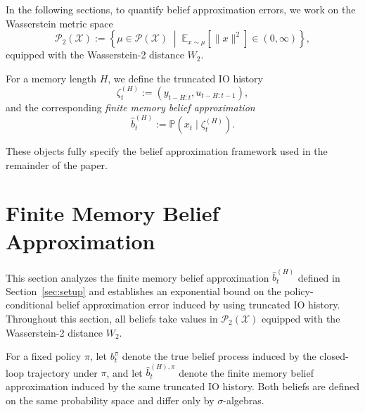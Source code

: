 \documentclass[letterpaper, 10 pt, conference]{ieeeconf}
\begin{document}
In the following sections, to quantify belief approximation errors, we work on the Wasserstein metric space
\begin{equation}
\label{eq:Wasserstein-metric-space}
\mathcal{P}_2(\mathcal{X}) :=
\left\{
\mu\in\mathcal{P}(\mathcal{X})
\;\middle|\;
\mathbb{E}_{x\sim\mu}[\|x\|^2]\in (0, \infty)
\right\},
\end{equation}
equipped with the Wasserstein-2 distance $W_2$.

For a memory length $H$, we define the truncated IO history
\begin{equation}
\zeta_t^{(H)} := (y_{t-H:t},u_{t-H:t-1}),
\end{equation}
and the corresponding \emph{finite memory belief approximation}
\begin{equation}
\hat b_t^{(H)} := \mathbb{P}(x_t\mid \zeta_t^{(H)}).
\end{equation}

These objects fully specify the belief approximation framework used in the remainder of the paper.



\section{Finite Memory Belief Approximation}
\label{sec:finite-memory}

This section analyzes the finite memory belief approximation $\hat b_t^{(H)}$ defined in Section~\ref{sec:setup} and establishes an exponential bound on the policy-conditional belief approximation error induced by using truncated IO history.
Throughout this section, all beliefs take values in $\mathcal{P}_2(\mathcal{X})$ equipped with the Wasserstein-2 distance $W_2$.

For a fixed policy $\pi$, let $b_t^\pi$ denote the true belief process induced by the closed-loop trajectory under $\pi$, and let $\hat b_t^{(H),\pi}$ denote the finite memory belief approximation induced by the same truncated IO history.
Both beliefs are defined on the same probability space and differ only by $\sigma$-algebras.
\end{document}
